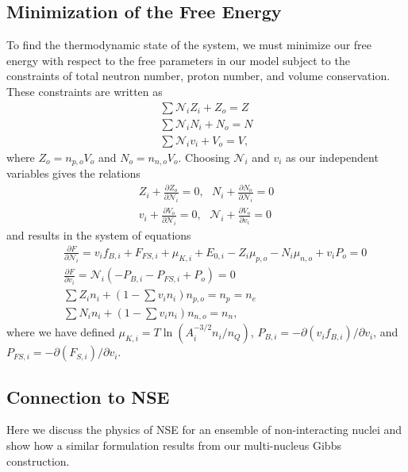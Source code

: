 \documentclass[11pt,letter]{article}
\begin{document}
\subsection{Minimization of the Free Energy}
\label{sec:minimization}
To find the thermodynamic state of the system, we must minimize our free energy
with respect to the free parameters in our model subject to the constraints of
total neutron number, proton number, and volume conservation.  These constraints
are written as \begin{eqnarray}
\sum \mathcal{N}_i Z_i + Z_o = Z \\
\sum \mathcal{N}_i N_i + N_o = N \\
\sum \mathcal{N}_i v_i + V_o = V, 
\end{eqnarray}
where $Z_o = n_{p,o} V_o$ and $N_o = n_{n,o} V_o$.  Choosing $\mathcal{N}_i$ and
$v_i$ as our independent variables gives the relations \begin{eqnarray} 
Z_i + \frac{\partial Z_o}{\partial \mathcal{N}_i} = 0, \,\, \,\,
N_i + \frac{\partial N_o}{\partial \mathcal{N}_i} = 0 \\
v_i + \frac{\partial V_o}{\partial \mathcal{N}_i} = 0, \,\, \,\,
\mathcal{N}_i + \frac{\partial V_o}{\partial v_i} = 0
\end{eqnarray}
and results in the system of equations 
\begin{eqnarray}
\label{eq:dFdN}
&&\frac{\partial F}{\partial \mathcal{N}_i} = v_i f_{B,i} + F_{FS,i} 
+ \mu_{K,i} + E_{0,i} - Z_i \mu_{p,o} - N_i \mu_{n,o} + v_i P_o  = 0 \\
\label{eq:dFdv}
&&\frac{\partial F}{\partial v_i} = \mathcal{N}_i 
\left(- P_{B,i} - P_{FS,i} + P_{o} \right) = 0 \\ 
&&\sum Z_i n_i + \left(1-\sum v_i n_i \right) n_{p,o} = n_p = n_e \\
&&\sum N_i n_i + \left(1-\sum v_i n_i \right) n_{n,o} = n_n,
\end{eqnarray}
where we have defined $\mu_{K,i} = T \ln (A_i^{-3/2} n_i/n_Q)$, 
$P_{B,i} = -\partial (v_i f_{B,i}) / \partial v_i$, and 
$P_{FS,i} = -\partial (F_{S,i}) / \partial v_i$.


\subsection{Connection to NSE} 
Here we discuss the physics of NSE for an ensemble of non-interacting nuclei and
show how a similar formulation results from our multi-nucleus Gibbs
construction.  
\end{document}
